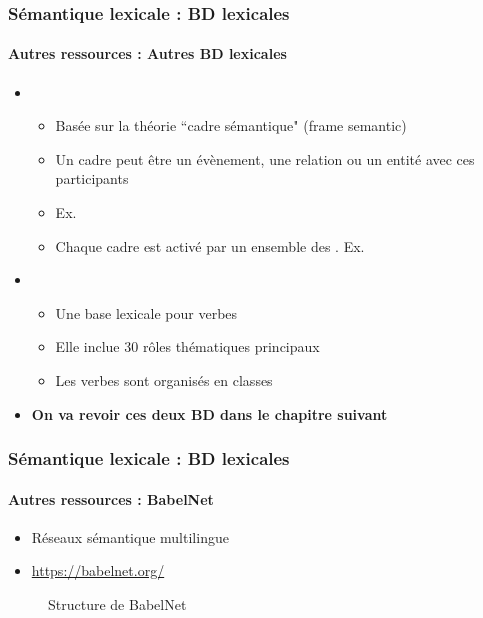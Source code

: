 \documentclass[xcolor=table]{beamer}
\begin{document}
\begin{frame}
\frametitle{Sémantique lexicale : BD lexicales}
\framesubtitle{Autres ressources : Autres BD lexicales}
	
\begin{itemize}
	\item {} 
	\begin{itemize}
		\item Basée sur la théorie ``cadre sémantique" (frame semantic)
		\item Un cadre peut être un évènement, une relation ou un entité avec ces participants 
		\item Ex. 
		\item Chaque cadre est activé par un ensemble des . Ex. 
	\end{itemize}
	\item {} 
	\begin{itemize}
		\item Une base lexicale pour verbes
		\item Elle inclue 30 rôles thématiques principaux 
		\item Les verbes sont organisés en classes
	\end{itemize}
	\item \textbf{On va revoir ces deux BD dans le chapitre suivant}
\end{itemize}
	
\end{frame}

\begin{frame}
\frametitle{Sémantique lexicale : BD lexicales}
\framesubtitle{Autres ressources : BabelNet}

\begin{itemize}
	\item Réseaux sémantique multilingue
	\item \url{https://babelnet.org/}
\end{itemize}

\begin{figure}
	\caption{Structure de BabelNet \cite{2012-navigli-ponzetto}}
\end{figure}
	
\end{frame}

\end{document}
